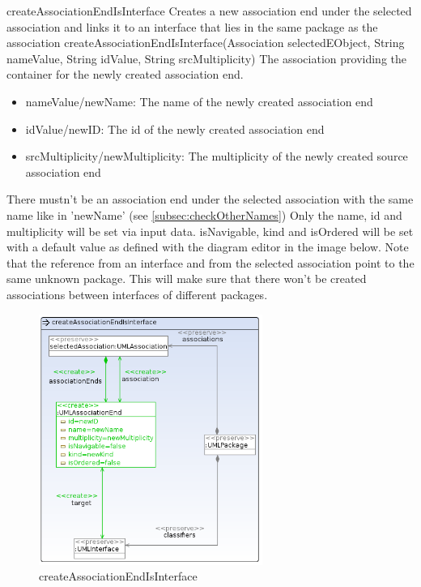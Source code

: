 \op
{createAssociationEndIsInterface}
{Creates a new association end under the selected association and links it to an
interface that lies in the same package as the association}
{createAssociationEndIsInterface(Association
selectedEObject, String nameValue, String idValue, String srcMultiplicity)} {The
association providing the container for the newly created association end.} {
\begin{itemize}
 \item nameValue/newName: The name of the newly created association end
 \item idValue/newID: The id of the newly created association end
 \item srcMultiplicity/newMultiplicity: The multiplicity of the newly created
 source association end
\end{itemize}
}
{There mustn't be an association end under the selected association with the
same name like in 'newName' (see
\ref{subsec:checkOtherNames})}
{Only the name, id and multiplicity will be set via input data. isNavigable,
kind and isOrdered will be set with a default value as defined with the diagram
editor in the image below.
Note that the reference from an interface and from the selected association
point to the same unknown package. This will make sure that there won't be created
associations between interfaces of different packages.}
\begin{figure}[H]
  \centering
  \includegraphics[width=0.65\textwidth]{pics/createAssociationEndIsInterface.png}
  \caption{createAssociationEndIsInterface}
  \label{createAssociationEndIsInterface}
\end{figure}
